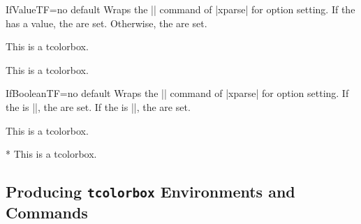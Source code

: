 \clearpage
\begin{docTcbKey}{IfValueTF}{=}{no default}
  Wraps the |\IfValueTF| command of |xparse| for option setting.
  If the  has a value, the  are set.
  Otherwise, the  are set.
\begin{dispExample}

\begin{mybox}
This is a tcolorbox.
\end{mybox}

\begin{mybox}[My title]
This is a tcolorbox.
\end{mybox}
\end{dispExample}
\end{docTcbKey}

\begin{docTcbKey}{IfBooleanTF}{=}{no default}
  Wraps the |\IfBooleanTF| command of |xparse| for option setting.
  If the  is |\BooleanTue|, the  are set.
  If the  is |\BooleanFalse|, the  are set.

\begin{dispExample}

\begin{mybox}
This is a tcolorbox.
\end{mybox}

\begin{mybox}*
This is a tcolorbox.
\end{mybox}
\end{dispExample}
\end{docTcbKey}



\clearpage
\subsection{Producing \texttt{tcolorbox} Environments and Commands}\label{subsec:xparse_tcolorbox}

